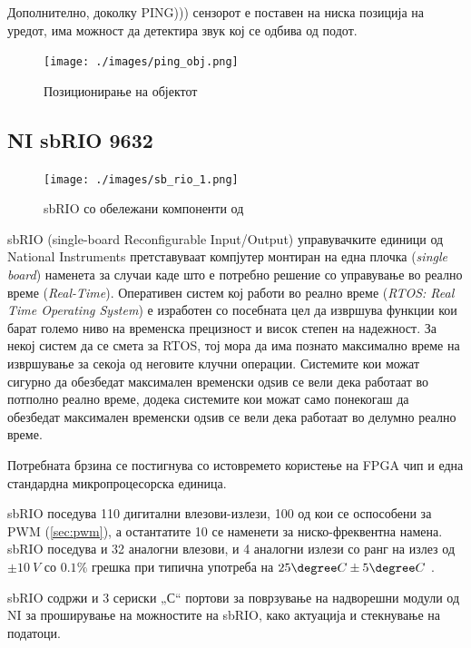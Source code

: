 \documentclass[11pt]{article}
\begin{document}
		  Дополнително, доколку PING))) сензорот е поставен на ниска позиција на уредот, има можност да детектира звук кој се одбива од подот.

      \begin{figure}[h]
        \texttt{[image: ./images/ping\_obj.png]}
        \centering
        \caption{Позиционирање на објектот}
        \label{fig:ping_obj.png}
        \end{figure}
  \newpage
  \subsection{NI sbRIO 9632}
	  \begin{figure}[h]
		  \centering
		  \texttt{[image: ./images/sb\_rio\_1.png]}
		  \caption{sbRIO со обележани компоненти од \cite{experiments}}
		  \label{fig:sb_rio_1.png}
		  \end{figure}

    sbRIO (single-board Reconfigurable Input/Output) управувачките единици од National Instruments претставуваат компјутер монтиран на една плочка (\textit{single board}) наменета за случаи каде што е потребно решение со управување во реално време (\textit{Real-Time}). Оперативен систем кој работи во реално време (\textit{RTOS: Real Time Operating System}) е изработен со посебната цел да извршува функции кои барат големо ниво на временска прецизност и висок степен на надежност. За некој систем да се смета за RTOS, тој мора да има познато максимално време на извршување за секоја од неговите клучни операции. Системите кои можат сигурно да обезбедат максимален временски одѕив се вели дека работаат во потполно реално време, додека системите кои можат само понекогаш да обезбедат максимален временски одѕив се вели дека работаат во делумно реално време.

	  Потребната брзина се постигнува со истовремето користење на FPGA чип и една стандардна микропроцесорска единица.

	  sbRIO поседува 110 дигитални влезови-излези, 100 од кои се оспособени за PWM (\ref{sec:pwm}), а остантатите 10 се наменети за ниско-фреквентна намена. sbRIO поседува и 32 аналогни влезови, и 4 аналогни излези со ранг на излез од $ \pm 10\ V$ со $0.1\%$ грешка при типична употреба на $25\degree C \pm5\degree C$ \cite{sbrio}.

	  sbRIO содржи и 3 сериски „С“ портови за поврзување на надворешни модули од NI за проширување на можностите на sbRIO, како актуација и стекнување на податоци.
\end{document}
